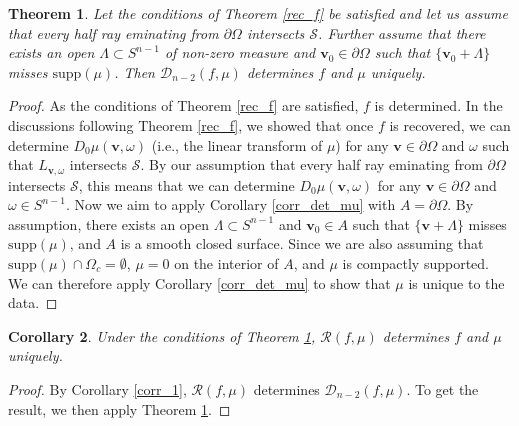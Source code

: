 \documentclass[a4paper,12pt]{amsart}
\numberwithin{equation}{section}
\theoremstyle{plain}
\newtheorem{theorem}{Theorem}
\numberwithin{theorem}{section}
\newtheorem{corollary}[theorem]{Corollary}
\theoremstyle{definition}
\theoremstyle{remark}
\theoremstyle{remark}
\theoremstyle{remark}
\newcommand{\s}{\mathcal S}
\newcommand{\vv}{{\mathbf{v}}}
\begin{document}
{\begin{theorem}\label{det_mu}
Let the conditions of Theorem \ref{rec_f} be satisfied and let us assume that every half ray eminating from $\partial \Omega$ intersects $\s$. Further assume that there exists an open $\Lambda \subset S^{n-1}$ of non-zero measure and $\vv_0 \in \partial \Omega$ such that $\{\vv_0 + \Lambda\}$ misses $\text{supp}(\mu)$. Then $\mathcal{D}_{n-2}(f,\mu)$ determines $f$ and $\mu$ uniquely.
\end{theorem}
\begin{proof}
As the conditions of Theorem \ref{rec_f} are satisfied, $f$ is determined. In the discussions following Theorem \ref{rec_f}, we showed that once $f$ is recovered, we can determine $D_0\mu(\vv,\omega)$ (i.e., the linear transform of $\mu$) for any $\vv \in \partial \Omega$ and $\omega$ such that $L_{\vv,\omega}$ intersects $\s$. By our assumption that every half ray eminating from $\partial \Omega$ intersects $\s$, this means that we can determine $D_0\mu(\vv,\omega)$ for any $\vv \in \partial \Omega$ and $\omega \in S^{n-1}$. Now we aim to apply Corollary \ref{corr_det_mu} with $A = \partial \Omega$. By assumption, there exists an open $\Lambda \subset S^{n-1}$ and $\vv_0 \in A$ such that $\{\vv + \Lambda\}$ misses $\text{supp}(\mu)$, and $A$ is a smooth closed surface. Since we are also assuming that $\text{supp}(\mu) \cap \Omega_c = \emptyset$, $\mu = 0$ on the interior of $A$, and $\mu$ is compactly supported. We can therefore apply Corollary \ref{corr_det_mu} to show that $\mu$ is unique to the data.
\end{proof}

\begin{corollary} \label{cor:uniqueness}
Under the conditions of Theorem \ref{det_mu}, $\mathcal{R}(f,\mu)$ determines $f$ and $\mu$ uniquely.
\end{corollary}

\begin{proof}
By Corollary \ref{corr_1}, $\mathcal{R}(f,\mu)$ determines $\mathcal{D}_{n-2}(f,\mu)$. To get the result, we then apply Theorem \ref{det_mu}.
\end{proof}

}
\end{document}
